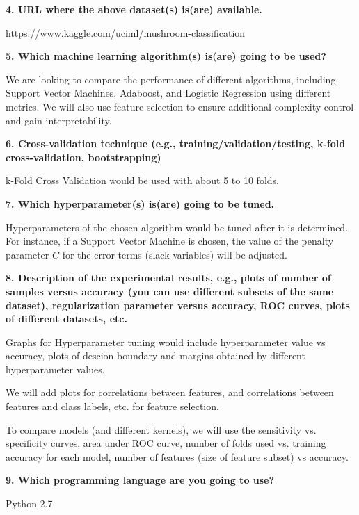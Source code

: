 \documentclass[10pt,letterpaper]{article}
\newcommand{\somespace}{\vspace{0.075in}}
\begin{document}
\somespace
\noindent \textbf{4. URL where the above dataset(s) is(are) available.}
\somespace

https://www.kaggle.com/uciml/mushroom-classification

\somespace
\noindent \textbf{5. Which machine learning algorithm(s) is(are) going to be used?}
\somespace

We are looking to compare the performance of different algorithms, including
Support Vector Machines, Adaboost, and Logistic Regression using different metrics. We
will also use feature selection to ensure additional complexity control and gain
interpretability.

\somespace
\noindent \textbf{6. Cross-validation technique (e.g., training/validation/testing, k-fold cross-validation, bootstrapping)}
\somespace

k-Fold Cross Validation would be used with about 5 to 10 folds.

\somespace
\noindent \textbf{7. Which hyperparameter(s) is(are) going to be tuned.}
\somespace

Hyperparameters of the chosen algorithm would be tuned after it is determined. For instance,
if a Support Vector Machine is chosen, the value of the penalty parameter $ C $ for the
error terms (slack variables) will be adjusted.

\somespace
\noindent \textbf{8. Description of the experimental results, e.g., plots of number of samples versus accuracy (you can use different subsets of the same dataset), regularization parameter versus accuracy, ROC curves, plots of different datasets, etc.}
\somespace

Graphs for Hyperparameter tuning would include hyperparameter value vs accuracy, plots of
descion boundary and margins obtained by different hyperparameter values.

We will add plots for correlations between features, and correlations between features and
class labels, etc. for feature selection.

To compare models (and different kernels), we will use the sensitivity vs. specificity
curves, area under ROC curve, number of folds used vs. training accuracy for each model,
number of features (size of feature subset) vs accuracy.

\somespace
\noindent \textbf{9. Which programming language are you going to use?}
\somespace

Python-2.7

\somespace
\end{document}
